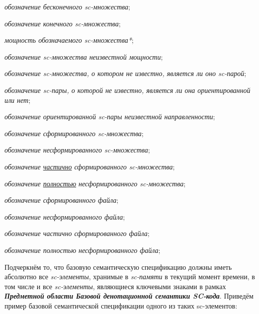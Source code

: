 \begin{textitemize}
	\item \textit{обозначение бесконечного sc-множества};
	\item \textit{обозначение конечного sc-множества};
	\item \textit{мощность обозначаемого sc-множества*};
	\item \textit{обозначение sc-множества неизвестной мощности};
	\item \textit{обозначение sc-множества, о котором не известно, является ли оно sc-парой};
	\item \textit{обозначение sc-пары, о которой не известно, является ли она ориентированной или нет};
	\item \textit{обозначение ориентированной sc-пары неизвестной направленности};
	\item \textit{обозначение сформированного sc-множества};
	\item \textit{обозначение несформированного sc-множества};
	\item \textit{обозначение \underline{частично} сформированного sc-множества};
	\item \textit{обозначение \underline{полностью} несформированного sc-множества};
	\item \textit{обозначение сформированного файла};
	\item \textit{обозначение несформированного файла};
	\item \textit{обозначение частично сформированного файла};
	\item \textit{обозначение полностью несформированного файла};
\end{textitemize}

Подчеркнём то, что базовую семантическую спецификацию должны иметь абсолютно все \textit{sc-элементы}, хранимые в \textit{sc-памяти} в текущий момент времени, в том числе и все \textit{sc-элементы}, являющиеся ключевыми знаками в рамках \textbf{\textit{Предметной области Базовой денотационной семантики SC-кода}}. Приведём пример базовой семантической спецификации одного из таких sc-элементов:

